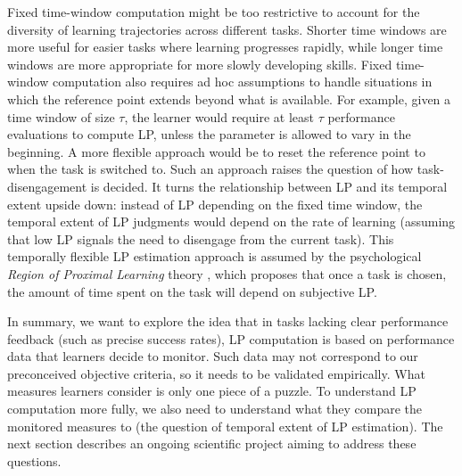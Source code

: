 
Fixed time-window computation might be too restrictive to account for the diversity of learning trajectories across different tasks. Shorter time windows are more useful for easier tasks where learning progresses rapidly, while longer time windows are more appropriate for more slowly developing skills. Fixed time-window computation also requires ad hoc assumptions to handle situations in which the reference point extends beyond what is available. For example, given a time window of size $\tau$, the learner would require at least $\tau$ performance evaluations to compute \ac{LP}, unless the parameter is allowed to vary in the beginning. A more flexible approach would be to reset the reference point to when the task is switched to. Such an approach raises the question of how task-disengagement is decided. It turns the relationship between \ac{LP} and its temporal extent upside down: instead of \ac{LP} depending on the fixed time window, the temporal extent of \ac{LP} judgments would depend on the rate of learning (assuming that low \ac{LP} signals the need to disengage from the current task). This temporally flexible \ac{LP} estimation approach is assumed by the psychological \emph{Region of Proximal Learning} theory \parencite{metcalfe_region_2005}, which proposes that once a task is chosen, the amount of time spent on the task will depend on subjective \ac{LP}.

In summary, we want to explore the idea that in tasks lacking clear performance feedback (such as precise success rates), \ac{LP} computation is based on performance data that learners decide to monitor. Such data may not correspond to our preconceived objective criteria, so it needs to be validated empirically. What measures learners consider is only one piece of a puzzle. To understand \ac{LP} computation more fully, we also need to understand what they compare the monitored measures to (the question of temporal extent of \ac{LP} estimation). The next section describes an ongoing scientific project aiming to address these questions.

